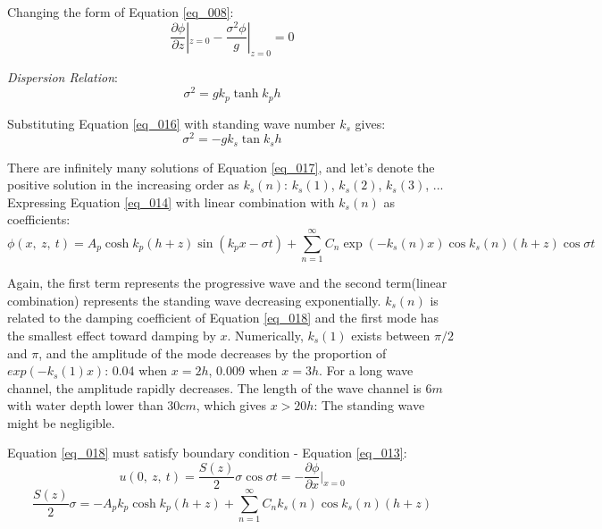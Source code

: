 Changing the form of Equation \ref{eq_008}:
\begin{equation}
    \frac{\partial \phi}{\partial z}|_{z=0} - \frac{\sigma^2 \phi}{g}|_{z=0} = 0\label{eq_015}
\end{equation}

\emph{Dispersion Relation}:
\begin{equation}
    \sigma^2 = gk_{p} \tanh{k_p h}\label{eq_016}
\end{equation}

Substituting Equation \ref{eq_016} with standing wave number $k_s$ gives:
\begin{equation}
    \sigma^2 = -gk_{s} \tan{k_s h}\label{eq_017}
\end{equation}

There are infinitely many solutions of Equation \ref{eq_017}, and let's denote the positive solution in the increasing order as $k_{s}(n)$: $k_{s}(1)$, $k_{s}(2)$, $k_{s}(3)$, ...\\
Expressing Equation \ref{eq_014} with linear combination with $k_{s}(n)$ as coefficients:
\begin{equation}
    \phi(x, ~z, ~t) = A_p \cosh{k_p (h+z)} \sin{(k_p x - \sigma t)} + \sum_{n=1}^{\infty} C_{n} \exp(-k_{s}(n) x) \cos{k_{s}(n) (h+z)} \cos{\sigma t}\label{eq_018}
\end{equation}

Again, the first term represents the progressive wave and the second term(linear combination) represents the standing wave decreasing exponentially. $k_s (n)$ is related to the damping coefficient of Equation \ref{eq_018} and the first mode has the smallest effect toward damping by $x$. Numerically, $k_s (1)$ exists between $\pi/2$ and $\pi$, and the amplitude of the mode decreases by the proportion of $exp(-k_s (1) x)$: 0.04 when $x=2h$, 0.009 when $x=3h$. For a long wave channel, the amplitude rapidly decreases. The length of the wave channel is $6m$ with water depth lower than $30cm$, which gives $x>20h$: The standing wave might be negligible.

Equation \ref{eq_018} must satisfy boundary condition - Equation \ref{eq_013}:
\begin{equation}
    u(0, ~z, ~t) = \frac{S(z)}{2} \sigma \cos{\sigma t} = - \frac{\partial \phi}{\partial x}|_{x=0}\label{eq_019}
\end{equation}
\begin{equation}
    \frac{S(z)}{2} \sigma = - A_p k_p \cosh{k_p (h+z)} + \sum_{n=1}^{\infty} C_n k_s (n) \cos{k_s (n) (h+z)}\label{eq_020}
\end{equation}

